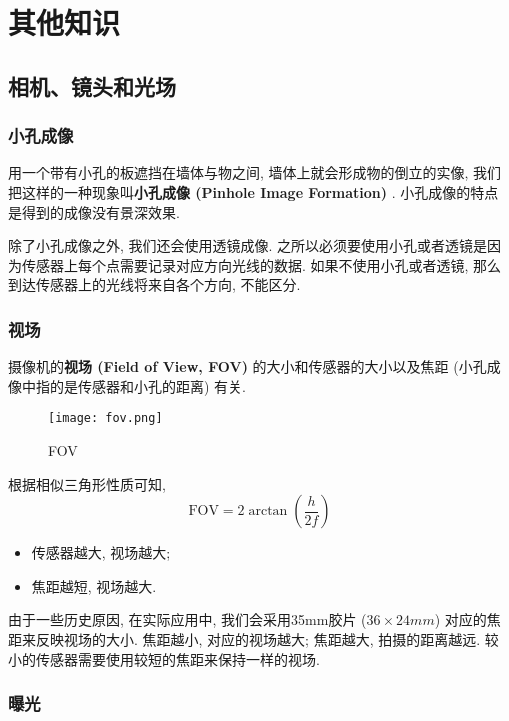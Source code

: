 \part{其他知识}

\chapter{相机、镜头和光场}

\section{小孔成像}

用一个带有小孔的板遮挡在墙体与物之间, 墙体上就会形成物的倒立的实像, 我们把这样的一种现象叫\textbf{小孔成像 (Pinhole Image Formation) }. 小孔成像的特点是得到的成像没有景深效果. 

除了小孔成像之外, 我们还会使用透镜成像. 之所以必须要使用小孔或者透镜是因为传感器上每个点需要记录对应方向光线的数据. 如果不使用小孔或者透镜, 那么到达传感器上的光线将来自各个方向, 不能区分. 

\section{视场}

摄像机的\textbf{视场 (Field of View, FOV) }的大小和传感器的大小以及焦距 (小孔成像中指的是传感器和小孔的距离) 有关. 

\begin{figure}[H]
	\centering
	\texttt{[image: fov.png]}
	\caption{FOV}
	\label{fig:fov}
\end{figure}

根据相似三角形性质可知, 
\begin{equation}
	\text{FOV}=2\arctan(\frac{h}{2f})
\end{equation}

\begin{itemize}
	\item 传感器越大, 视场越大; 
	\item 焦距越短, 视场越大. 
\end{itemize}

由于一些历史原因, 在实际应用中, 我们会采用35mm胶片 ($36\times 24 mm$) 对应的焦距来反映视场的大小. 焦距越小, 对应的视场越大; 焦距越大, 拍摄的距离越远. 较小的传感器需要使用较短的焦距来保持一样的视场. 

\section{曝光}

